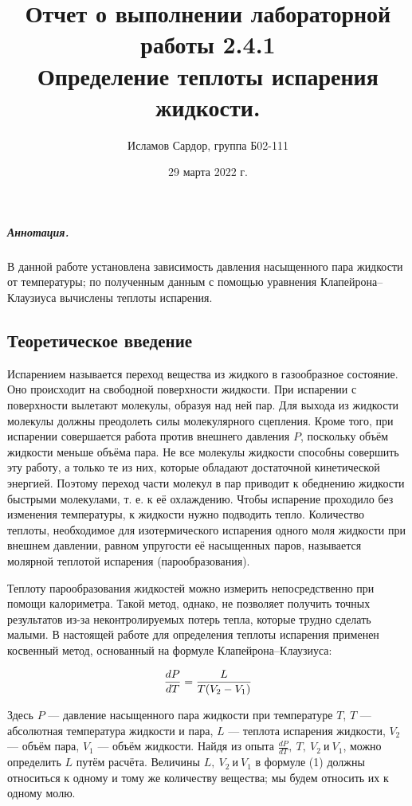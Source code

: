 \documentclass[12pt,a4paper]{article}
\title{
Отчет о выполнении лабораторной работы 2.4.1 \\
Определение теплоты испарения жидкости.}
\author{Исламов Сардор, группа Б02-111}
\date{29 марта 2022 г.}
\begin{document}
\maketitle

\subparagraph*{Аннотация.} В данной работе установлена зависимость давления насыщенного пара жидкости от температуры;
по полученным данным с помощью уравнения Клапейрона–Клаузиуса вычислены теплоты испарения.

\subsection*{Теоретическое введение}
Испарением называется переход вещества из жидкого в газообразное состояние. 
Оно происходит на свободной поверхности жидкости. 
При испарении с поверхности вылетают молекулы, образуя над ней пар. 
Для выхода из жидкости молекулы должны преодолеть силы молекулярного сцепления. 
Кроме того, при испарении совершается работа против внешнего давления $P$, поскольку объём жидкости меньше объёма пара. 
Не все молекулы жидкости способны совершить эту работу, а только те из них, которые обладают достаточной кинетической энергией. 
Поэтому переход части молекул в пар приводит к обеднению жидкости быстрыми молекулами, т. е. к её охлаждению. 
Чтобы испарение проходило без изменения температуры, к жидкости нужно подводить тепло. 
Количество теплоты, необходимое для изотермического испарения одного моля жидкости при внешнем давлении, равном упругости её насыщенных паров, называется молярной теплотой испарения (парообразования).

Теплоту парообразования жидкостей можно измерить непосредственно при помощи калориметра. 
Такой метод, однако, не позволяет получить точных результатов из-за неконтролируемых потерь тепла, которые трудно сделать малыми. 
В настоящей работе для определения теплоты испарения применен косвенный метод, основанный на формуле Клапейрона–Клаузиуса:

\begin{equation}
    \frac{dP}{dT} = {L \over T(V_2-V_1)}
\end{equation}

Здесь $P$ — давление насыщенного пара жидкости при температуре $T$, $T$ — абсолютная температура жидкости и пара, $L$ — теплота испарения жидкости, $V_2$ — объём пара, $V_1$ — объём жидкости. 
Найдя из опыта $\frac{dP}{dT},\ T,\ V_2\ и\ V_1$, можно определить $L$ путём расчёта. 
Величины $L,\ V_2\ и\ V_1$ в формуле (1) должны относиться к одному и тому же количеству вещества; мы будем относить их к одному молю.
\end{document}
